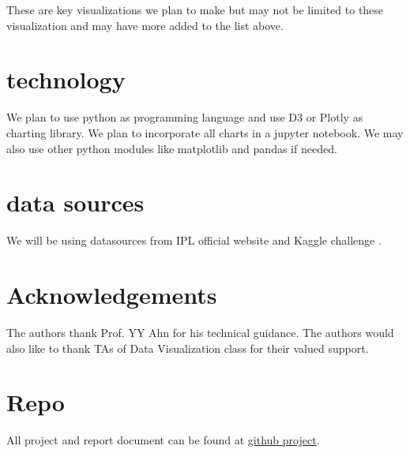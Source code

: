 \documentclass[sigconf]{acmart}
\begin{document}
These are key visualizations we plan to make but may not be limited to these 
visualization and may have more added to the list above. 

\section{technology}
We plan to use python as programming language and use D3 or Plotly as charting
library. We plan to incorporate all charts in a jupyter notebook. We may also
use other python modules like matplotlib and pandas if needed. 

\section{data sources}
We will be using datasources from IPL \cite{www-iplt20} official website
and Kaggle challenge \cite{www-kragle-iplc}.



%

%



\section{Acknowledgements}
 The authors thank Prof. YY Ahn for his technical guidance. The
 authors would also like to thank TAs of Data Visualization class for their valued
 support. 

\section{Repo} 
 All project and report document can be found at \href{https://github.com/abhishek8gupta/dviz-project-summer2018}{github project}.

\nocite{*}


\end{document}
